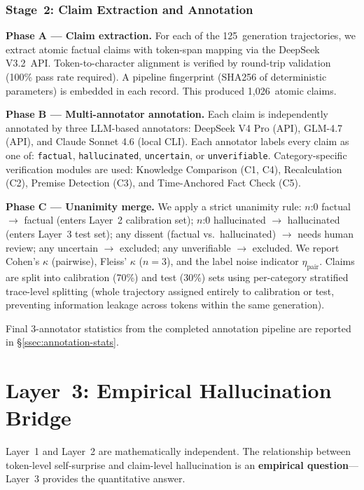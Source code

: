 \documentclass[runningheads]{llncs}
\begin{document}
\subsubsection{Stage~2: Claim Extraction and Annotation}

\textbf{Phase A --- Claim extraction.} For each of the 125~generation
trajectories, we extract atomic factual claims with token-span mapping via the
DeepSeek V3.2~API. Token-to-character alignment is verified by round-trip
validation (100\% pass rate required). A pipeline fingerprint (SHA256 of
deterministic parameters) is embedded in each record. This produced
1,026~atomic claims.

\textbf{Phase B --- Multi-annotator annotation.} Each claim is independently
annotated by three LLM-based annotators:
DeepSeek V4 Pro (API),
GLM-4.7 (API), and
Claude Sonnet 4.6 (local CLI).
Each annotator labels every claim as one of:
\texttt{factual}, \texttt{hallucinated}, \texttt{uncertain}, or
\texttt{unverifiable}. Category-specific verification modules are used:
Knowledge Comparison (C1, C4), Recalculation (C2), Premise Detection (C3),
and Time-Anchored Fact Check (C5).

\textbf{Phase C --- Unanimity merge.} We apply a strict unanimity rule:
$n$:0 factual $\to$ factual (enters Layer~2 calibration set);
$n$:0 hallucinated $\to$ hallucinated (enters Layer~3 test set);
any dissent (factual vs.\ hallucinated) $\to$ needs human review;
any uncertain $\to$ excluded;
any unverifiable $\to$ excluded.
We report Cohen's $\kappa$ (pairwise), Fleiss' $\kappa$ ($n=3$), and the
label noise indicator $\eta_{\text{pair}}$. Claims are split into
calibration (70\%) and test (30\%) sets using per-category stratified
trace-level splitting (whole trajectory assigned entirely to calibration or
test, preventing information leakage across tokens within the same generation).

Final 3-annotator statistics from the completed annotation pipeline are
reported in \S\ref{ssec:annotation-stats}.

\section{Layer~3: Empirical Hallucination Bridge}

Layer~1 and Layer~2 are mathematically independent. The relationship between
token-level self-surprise and claim-level hallucination is an \textbf{empirical
question}---Layer~3 provides the quantitative answer.
\end{document}
